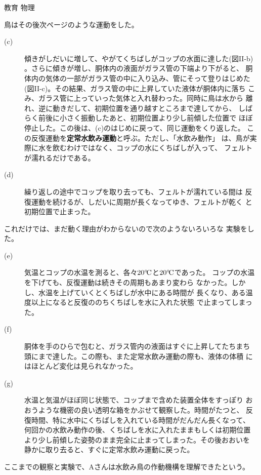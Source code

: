 \documentclass[fleqn]{jbook}
\begin{document}
\begin{question}{教育 物理}{}
\begin{subquestions}
\begin{description}
  \end{description}
  鳥はその後次ページのような運動をした。

\newpage
  \begin{description}
  \item[(c)]
    傾きがしだいに増して、やがてくちばしがコップの水面に達した(図II-b)
    。さらに傾きが増し、胴体内の液面がガラス管の下端より下がると、
    胴体内の気体の一部がガラス管の中に入り込み、管にそって登りはじめた
    (図II-c)。その結果、ガラス管の中に上昇していた液体が胴体内に落ち
    こみ、ガラス管に上っていった気体と入れ替わった。同時に鳥は水から
    離れ、逆に動きだして、初期位置を通り越すところまで達してから、
    しばらく前後に小さく振動したあと、初期位置より少し前傾した位置で
    ほぼ停止した。この後は、(c)のはじめに戻って、同じ運動をくり返した。
    この反復運動を{\bf 定常水飲み運動}と呼ぶ。ただし、「水飲み動作」
    は、鳥が実際に水を飲むわけではなく、コップの水にくちばしが入って、
    フェルトが濡れるだけである。

  \item[(d)]
    繰り返しの途中でコップを取り去っても、フェルトが濡れている間は
    反復運動を続けるが、しだいに周期が長くなってゆき、フェルトが乾く
    と初期位置で止まった。

  \end{description}
  これだけでは、まだ動く理由がわからないので次のようないろいろな
  実験をした。
  \begin{description}
  \item[(e)]
    気温とコップの水温を測ると、各々$20^{\circ}\!\rm C$と$20^{\circ}\!\rm C$であった。
    コップの水温を下げても、反復運動は続きその周期もあまり変わら
    なかった。しかし、水温を上げていくとくちばしが水中にある時間が
    長くなり、ある温度以上になると反復ののちくちばしを水に入れた状態
    で止まってしまった。

  \item[(f)]
    胴体を手のひらで包むと、ガラス管内の液面はすぐに上昇してたちまち
    頭にまで達した。この際も、また定常水飲み運動の際も、液体の体積
    にはほとんど変化は見られなかった。

  \item[(g)]
    水温と気温がほぼ同じ状態で、コップまで含めた装置全体をすっぽり
    おおうような機密の良い透明な箱をかぶせて観察した。時間がたつと、
    反復時間、特に水中にくちばしを入れている時間がだんだん長くなって、
    何回かの水飲み動作の後、くちばしを水に入れたままもしくは初期位置
    より少し前傾した姿勢のまま完全に止まってしまった。その後おおいを
    静かに取り去ると、すぐに定常水飲み運動に戻った。
  \end{description}
  ここまでの観察と実験で、Aさんは水飲み鳥の作動機構を理解できたという。



\end{subquestions}
\end{question}
\end{document}
